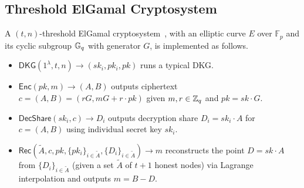 \subsection{Threshold ElGamal Cryptosystem}
\label{appendix:thrElGamal}
A $(t, n)$-threshold ElGamal cryptosystem~\cite{desmedt1990Threshold, fouque2001threshold, cherniaeva2019homomorphic}, with an elliptic curve $E$ over $\mathbb{F}_p$ and its cyclic subgroup $\mathbb{G}_q$ with generator $G$, is implemented as follows.
\begin{itemize}
    \item $\mathsf{DKG}(1^\lambda, t, n) \rightarrow (sk_i, pk_i, pk)$ runs a typical DKG.
    \item $\mathsf{Enc}(pk, m) \rightarrow (A, B)$ outputs ciphertext $c = (A, B) = (r G, m G + r \cdot pk)$ given $m, r \in \mathbb{Z}_q$ and $pk = sk \cdot G$.
    \item $\mathsf{DecShare}(sk_i, c) \rightarrow D_i$ outputs decryption share $D_i = sk_i \cdot A$ for $c = (A, B)$ using individual secret key $sk_i$.
    \item $\mathsf{Rec}(\tilde{A}, c, pk, \{pk_i\}_{i \in \tilde{A}}, \{D_i\}_{i \in \tilde{A}}) \rightarrow m$ reconstructs the point $D = sk \cdot A$ from $\{D_i\}_{i \in \tilde{A}}$ (given a set $\tilde{A}$ of $t + 1$ honest nodes) via Lagrange interpolation and outputs $m = B - D$.
\end{itemize}



